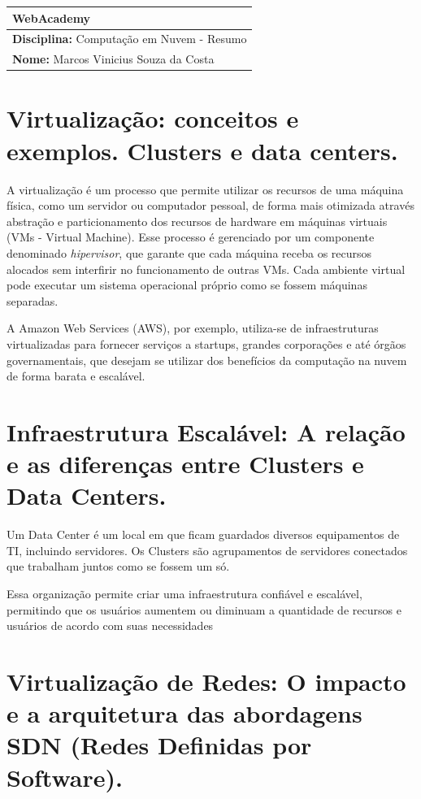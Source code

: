 \documentclass[a4paper, 12pt]{article}
\begin{document}
\renewcommand{\arraystretch}{1.25}

\noindent
\begin{tabular}{|p{\dimexpr\linewidth-2\tabcolsep-1.2pt}|}
    \hline
    \large WebAcademy\\
    \hline
    \large \textbf{Disciplina: }Computação em Nuvem - Resumo\\
    \hline
    \large \textbf{Nome: }Marcos Vinicius Souza da Costa\\
    \hline
\end{tabular}
 
\section{Virtualização: conceitos e exemplos. Clusters e data centers. }
A virtualização é um processo que permite utilizar os recursos de uma máquina física, como um servidor ou computador pessoal, de forma mais otimizada através abstração e particionamento dos recursos de hardware em máquinas virtuais (VMs - Virtual Machine). Esse processo é gerenciado por um componente denominado \textit{hipervisor}, que garante que cada máquina receba os recursos alocados sem interfirir no funcionamento de outras VMs. Cada ambiente virtual pode executar um sistema operacional próprio como se fossem máquinas separadas.

A Amazon Web Services (AWS), por exemplo, utiliza-se de infraestruturas virtualizadas para fornecer serviços a startups, grandes corporações e até órgãos governamentais, que desejam se utilizar dos benefícios da computação na nuvem de forma barata e escalável.

\section{Infraestrutura Escalável: A relação e as diferenças entre Clusters e Data Centers.}
Um Data Center é um local em que ficam guardados diversos equipamentos de TI, incluindo servidores. Os Clusters são agrupamentos de servidores conectados que trabalham juntos como se fossem um só.

Essa organização permite criar uma infraestrutura confiável e escalável, permitindo que os usuários aumentem ou diminuam a quantidade de recursos e usuários de acordo com suas necessidades

\section{Virtualização de Redes: O impacto e a arquitetura das abordagens SDN (Redes Definidas por Software).}
\end{document}

